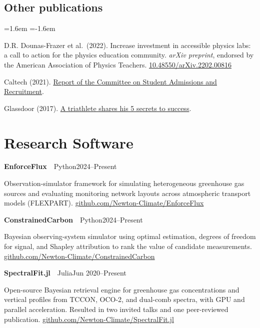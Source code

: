 \documentclass[11pt,letterpaper]{article}
\newcommand{\entry}[3]{\noindent\textbf{#1}~\textbar~#2\hfill{#3}\par}
\newenvironment{pubs}
  {\begin{list}{}{\leftmargin=1.6em \itemindent=-1.6em
   \topsep=3pt \itemsep=4pt \parsep=0pt}}
  {\end{list}}
\let\oldsection\section
\renewcommand{\section}[1]{\Needspace*{5\baselineskip}\oldsection{#1}}
\let\oldsubsection\subsection
\renewcommand{\subsection}[1]{\Needspace*{4\baselineskip}\oldsubsection{#1}}
\begin{document}
\subsection{Other publications}
\begin{pubs}
\item[3.] D.R. Dounas-Frazer et al.\ (2022). Increase investment in accessible physics labs: a call to action
  for the physics education community. \textit{arXiv preprint}, endorsed by the American Association of
  Physics Teachers. \href{https://doi.org/10.48550/arXiv.2202.00816}{10.48550/arXiv.2202.00816}

\item[2.] Caltech (2021). \href{https://inclusive.caltech.edu/documents/19303/Report_of_the_Committee_on_Student_Admissions_and_Recruitment.pdf}{Report
  of the Committee on Student Admissions and Recruitment}.

\item[1.] Glassdoor (2017). \href{https://www.glassdoor.com/blog/newton-nguyen/}{A triathlete shares his
  5 secrets to success}.
\end{pubs}

\section{Research Software}

\entry{EnforceFlux}{Python}{2024--Present}
Observation-simulator framework for simulating heterogeneous greenhouse gas sources and evaluating
monitoring network layouts across atmospheric transport models (FLEXPART).
\href{https://github.com/Newton-Climate/EnforceFlux}{github.com/Newton-Climate/EnforceFlux}
\vspace{4pt}

\entry{ConstrainedCarbon}{Python}{2024--Present}
Bayesian observing-system simulator using optimal estimation, degrees of freedom for signal, and Shapley
attribution to rank the value of candidate measurements.
\href{https://github.com/Newton-Climate/ConstrainedCarbon}{github.com/Newton-Climate/ConstrainedCarbon}
\vspace{4pt}

\entry{SpectralFit.jl}{Julia}{Jun 2020--Present}
Open-source Bayesian retrieval engine for greenhouse gas concentrations and vertical profiles from TCCON,
OCO-2, and dual-comb spectra, with GPU and parallel acceleration. Resulted in two invited talks and one
peer-reviewed publication.
\href{https://github.com/Newton-Climate/SpectralFit.jl}{github.com/Newton-Climate/SpectralFit.jl}
\vspace{4pt}
\end{document}
